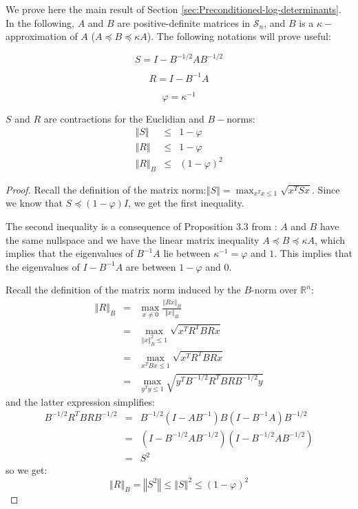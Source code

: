 We prove here the main result of Section \ref{sec:Preconditioned-log-determinants}.
In the following, $A$ and $B$ are positive-definite matrices in
$\mathcal{S}_{n}$, and $B$ is a $\kappa-$approximation of $A$
($A\preceq B\preceq\kappa A$). The following notations will prove
useful:

\begin{equation}
S=I-B^{-1/2}AB^{-1/2}\label{eq:S-def}
\end{equation}


\begin{equation}
R=I-B^{-1}A\label{eq:R-def}
\end{equation}


\[
\varphi=\kappa^{-1}
\]


\begin{lemma}\label{lem:S-R-contractions} $S$ and $R$ are contractions
for the Euclidian and $B-$norms: 
\begin{eqnarray*}
\left\Vert S\right\Vert  & \leq & 1-\varphi\\
\left\Vert R\right\Vert  & \leq & 1-\varphi\\
\left\Vert R\right\Vert _{B} & \leq & \left(1-\varphi\right)^{2}
\end{eqnarray*}
\end{lemma} 

\begin{proof} Recall the definition of the matrix norm:$\left\Vert S\right\Vert =\max_{x^{T}x\leq1}\sqrt{x^{T}Sx}$.
Since we know that $S\preceq\left(1-\varphi\right)I$, we get the
first inequality.

The second inequality is a consequence of Proposition 3.3 from \cite{Spielman2009a}:
$A$ and $B$ have the same nullspace and we have the linear matrix
inequality $A\preceq B\preceq\kappa A$, which implies that the eigenvalues
of $B^{-1}A$ lie between $\kappa^{-1}=\varphi$ and $1$. This implies
that the eigenvalues of $I-B^{-1}A$ are between $1-\varphi$ and
$0$.

Recall the definition of the matrix norm induced by the $B$-norm
over $\mathbb{R}^{n}$: 
\begin{eqnarray*}
\left\Vert R\right\Vert _{B} & = & \max_{x\neq0}\frac{\left\Vert Rx\right\Vert _{B}}{\left\Vert x\right\Vert _{B}}\\
 & = & \max_{\left\Vert x\right\Vert _{B}^{2}\leq1}\sqrt{x^{T}R^{T}BRx}\\
 & = & \max_{x^{T}Bx\leq1}\sqrt{x^{T}R^{T}BRx}\\
 & = & \max_{y^{T}y\leq1}\sqrt{y^{T}B^{-1/2}R^{T}BRB^{-1/2}y}
\end{eqnarray*}
and the latter expression simplifies: 
\begin{eqnarray*}
B^{-1/2}R^{T}BRB^{-1/2} & = & B^{-1/2}\left(I-AB^{-1}\right)B\left(I-B^{-1}A\right)B^{-1/2}\\
 & = & \left(I-B^{-1/2}AB^{-1/2}\right)\left(I-B^{-1/2}AB^{-1/2}\right)\\
 & = & S^{2}
\end{eqnarray*}
so we get: 
\[
\left\Vert R\right\Vert _{B}=\left\Vert S^{2}\right\Vert \leq\left\Vert S\right\Vert ^{2}\leq\left(1-\varphi\right)^{2}
\]


\end{proof} 

